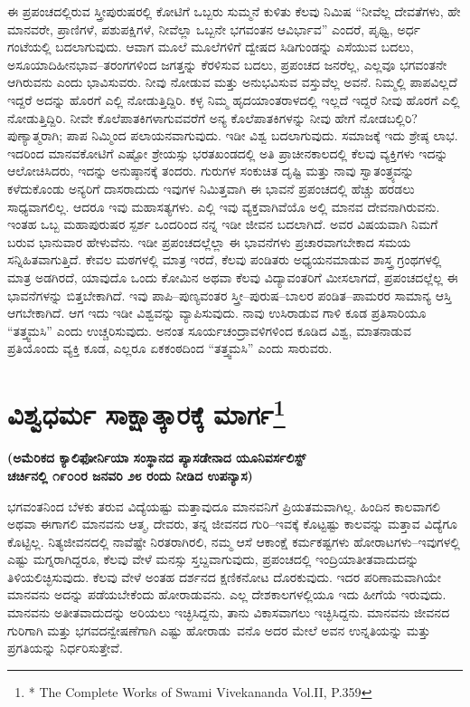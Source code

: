 ಈ ಪ್ರಪಂಚದಲ್ಲಿರುವ ಸ್ತ್ರೀಪುರುಷರಲ್ಲಿ ಕೋಟಿಗೆ ಒಬ್ಬರು ಸುಮ್ಮನೆ ಕುಳಿತು ಕೆಲವು ನಿಮಿಷ “ನೀವೆಲ್ಲ ದೇವತೆಗಳು, ಹೇ ಮಾನವರೇ, ಪ್ರಾಣಿಗಳೆ, ಪಶುಪಕ್ಷಿಗಳೆ, ನೀವೆಲ್ಲಾ ಒಬ್ಬನೇ ಭಗವಂತನ ಆವಿರ್ಭಾವ” ಎಂದರೆ, ಪೃಥ್ವಿ, ಅರ್ಧ ಗಂಟೆಯಲ್ಲಿ ಬದಲಾಗುವುದು. ಆವಾಗ ಮೂಲೆ ಮೂಲೆಗಳಿಗೆ ದ್ವೇಷದ ಸಿಡಿಗುಂಡನ್ನು ಎಸೆಯುವ ಬದಲು, ಅಸೂಯಾದಿಹೀನಭಾವ–ತರಂಗಗಳಿಂದ ಜಗತ್ತನ್ನು ಕೆರಳಿಸುವ ಬದಲು, ಪ್ರಪಂಚದ ಜನರೆಲ್ಲ, ಎಲ್ಲವೂ ಭಗವಂತನೇ ಆಗಿರುವನು ಎಂದು ಭಾವಿಸುವರು. ನೀವು ನೋಡುವ ಮತ್ತು ಅನುಭವಿಸುವ ವಸ್ತುವೆಲ್ಲ ಅವನೆ. ನಿಮ್ಮಲ್ಲಿ ಪಾಪವಿಲ್ಲದೆ ಇದ್ದರೆ ಅದನ್ನು ಹೊರಗೆ ಎಲ್ಲಿ ನೋಡುತ್ತಿದ್ದಿರಿ. ಕಳ್ಳ ನಿಮ್ಮ ಹೃದಯಾಂತರಾಳದಲ್ಲಿ ಇಲ್ಲದೆ ಇದ್ದರೆ ನೀವು ಹೊರಗೆ ಎಲ್ಲಿ ನೋಡುತ್ತಿದ್ದಿರಿ. ನೀವೇ ಕೊಲೆಪಾತಕಿಗಳಾಗುವವರೆಗೆ ಅನ್ಯ ಕೊಲೆಪಾತಕಿಗಳನ್ನು ನೀವು ಹೇಗೆ ನೋಡಬಲ್ಲಿರಿ? ಪುಣ್ಯಾತ್ಮರಾಗಿ; ಪಾಪ ನಿಮ್ಮಿಂದ ಪಲಾಯನವಾಗುವುದು. ಇಡೀ ವಿಶ್ವ ಬದಲಾಗುವುದು. ಸಮಾಜಕ್ಕೆ ಇದು ಶ್ರೇಷ್ಠ ಲಾಭ. ಇದರಿಂದ ಮಾನವಕೋಟಿಗೆ ಎಷ್ಟೋ ಶ್ರೇಯಸ್ಸು ಭರತಖಂಡದಲ್ಲಿ ಅತಿ ಪ್ರಾಚೀನಕಾಲದಲ್ಲಿ ಕೆಲವು ವ್ಯಕ್ತಿಗಳು ಇದನ್ನು ಆಲೋಚಿಸಿದರು, ಇದನ್ನು ಅನುಷ್ಠಾನಕ್ಕೆ ತಂದರು. ಗುರುಗಳ ಸಂಕುಚಿತ ದೃಷ್ಟಿ ಮತ್ತು ನಾವು ಸ್ವಾತಂತ್ರ್ಯವನ್ನು ಕಳೆದುಕೊಂಡು ಅನ್ಯರಿಗೆ ದಾಸರಾದುದು ಇವುಗಳ ನಿಮಿತ್ತವಾಗಿ ಈ ಭಾವನೆ ಪ್ರಪಂಚದಲ್ಲಿ ಹೆಚ್ಚು ಹರಡಲು ಸಾಧ್ಯವಾಗಲಿಲ್ಲ. ಆದರೂ ಇವು ಮಹಾಸತ್ಯಗಳು. ಎಲ್ಲಿ ಇವು ವ್ಯಕ್ತವಾಗಿವೆಯೊ ಅಲ್ಲಿ ಮಾನವ ದೇವನಾಗಿರುವನು. ಇಂತಹ ಒಬ್ಬ ಮಹಾಪುರುಷರ ಸ್ಪರ್ಶ ಒಂದರಿಂದ ನನ್ನ ಇಡೀ ಜೀವನ ಬದಲಾಗಿದೆ. ಅವರ ವಿಷಯವಾಗಿ ನಿಮಗೆ ಬರುವ ಭಾನುವಾರ ಹೇಳುವೆನು. ಇಡೀ ಪ್ರಪಂಚದಲ್ಲೆಲ್ಲಾ ಈ ಭಾವನೆಗಳು ಪ್ರಚಾರವಾಗಬೇಕಾದ ಸಮಯ ಸನ್ನಿಹಿತವಾಗುತ್ತಿದೆ. ಕೇವಲ ಮಠಗಳಲ್ಲಿ ಮಾತ್ರ ಇರದೆ, ಕೆಲವು ಪಂಡಿತರು ಅಧ್ಯಯನಮಾಡುವ ಶಾಸ್ತ್ರ ಗ್ರಂಥಗಳಲ್ಲಿ ಮಾತ್ರ ಅಡಗಿರದೆ, ಯಾವುದೊ ಒಂದು ಕೋಮಿನ ಅಥವಾ ಕೆಲವು ವಿದ್ಯಾವಂತರಿಗೆ ಮೀಸಲಾಗದೆ, ಪ್ರಪಂಚದಲ್ಲೆಲ್ಲ ಈ ಭಾವನೆಗಳನ್ನು ಬಿತ್ತಬೇಕಾಗಿದೆ. ಇವು ಪಾಪಿ–ಪುಣ್ಯವಂತರ ಸ್ತ್ರೀ–ಪುರುಷ–ಬಾಲರ ಪಂಡಿತ–ಪಾಮರರ ಸಾಮಾನ್ಯ ಆಸ್ತಿ ಆಗಬೇಕಾಗಿದೆ. ಆಗ ಇದು ಇಡೀ ವಿಶ್ವವನ್ನು ವ್ಯಾಪಿಸುವುದು. ನಾವು ಉಸಿರಾಡುವ ಗಾಳಿ ಕೂಡ ಪ್ರತಿಸಾರಿಯೂ “ತತ್ತ್ವಮಸಿ” ಎಂದು ಉಚ್ಚರಿಸುವುದು. ಅನಂತ ಸೂರ್ಯಚಂದ್ರಾವಳಿಗಳಿಂದ ಕೂಡಿದ ವಿಶ್ವ, ಮಾತನಾಡುವ ಪ್ರತಿಯೊಂದು ವ್ಯಕ್ತಿ ಕೂಡ, ಎಲ್ಲರೂ ಏಕಕಂಠದಿಂದ “ತತ್ತ್ವಮಸಿ” ಎಂದು ಸಾರುವರು.

\chapter{ವಿಶ್ವಧರ್ಮ ಸಾಕ್ಷಾತ್ಕಾರಕ್ಕೆ ಮಾರ್ಗ\protect\footnote{* The Complete Works of Swami Vivekananda Vol.II, P.359}}%

\begin{center}
\textbf{(ಅಮೆರಿಕದ ಕ್ಯಾಲಿಫೋರ್ನಿಯಾ ಸಂಸ್ಥಾನದ ಪ್ಯಾಸಡೇನಾದ ಯೂನಿವರ್ಸಲಿಸ್ಟ್​ \\ ಚರ್ಚಿನಲ್ಲಿ ೧೯೦೦ರ ಜನವರಿ ೨೮ ರಂದು ನೀಡಿದ ಉಪನ್ಯಾಸ)}
\end{center}

ಭಗವಂತನಿಂದ ಬೆಳಕು ತರುವ ವಿದ್ಯೆಯಷ್ಟು ಮತ್ತಾವುದೂ ಮಾನವನಿಗೆ ಪ್ರಿಯತಮವಾಗಿಲ್ಲ. ಹಿಂದಿನ ಕಾಲವಾಗಲಿ ಅಥವಾ ಈಗಾಗಲಿ ಮಾನವನು ಆತ್ಮ, ದೇವರು, ತನ್ನ ಜೀವನದ ಗುರಿ–ಇವಕ್ಕೆ ಕೊಟ್ಟಷ್ಟು ಕಾಲವನ್ನು ಮತ್ತಾವ ವಿದ್ಯೆಗೂ ಕೊಟ್ಟಿಲ್ಲ. ನಿತ್ಯಜೀವನದಲ್ಲಿ ನಾವೆಷ್ಟೇ ನಿರತರಾಗಿರಲಿ, ನಮ್ಮ ಆಸೆ ಆಕಾಂಕ್ಷೆ ಕರ್ಮಕಷ್ಟಗಳು ಹೋರಾಟಗಳು–ಇವುಗಳಲ್ಲಿ ಎಷ್ಟು ಮಗ್ನರಾಗಿದ್ದರೂ, ಕೆಲವು ವೇಳೆ ಮನಸ್ಸು ಸ್ತಬ್ದವಾಗುವುದು, ಪ್ರಪಂಚದಲ್ಲಿ ಇಂದ್ರಿಯಾತೀತವಾದುದನ್ನು ತಿಳಿಯಲಿಚ್ಛಿಸುವುದು. ಕೆಲವು ವೇಳೆ ಅಂತಹ ದರ್ಶನದ ಕ್ಷಣಿಕನೋಟ ದೊರಕುವುದು. ಇದರ ಪರಿಣಾಮವಾಗಿಯೇ ಮಾನವನು ಅದನ್ನು ಪಡೆಯಬೇಕೆಂದು ಹೋರಾಡುವನು. ಎಲ್ಲ ದೇಶಕಾಲಗಳಲ್ಲಿಯೂ ಇದು ಹೀಗೆಯೆ ಇರುವುದು. ಮಾನವನು ಅತೀತವಾದುದನ್ನು ಅರಿಯಲು ಇಚ್ಛಿಸಿದ್ದನು, ತಾನು ವಿಕಾಸವಾಗಲು ಇಚ್ಛಿಸಿದ್ದನು. ಮಾನವನು ಜೀವನದ ಗುರಿಗಾಗಿ ಮತ್ತು ಭಗವದನ್ವೇಷಣೆಗಾಗಿ ಎಷ್ಟು ಹೋರಾಡು\break\ ವನೊ ಅದರ ಮೇಲೆ ಅವನ ಉನ್ನತಿಯನ್ನು ಮತ್ತು ಪ್ರಗತಿಯನ್ನು ನಿರ್ಧರಿಸುತ್ತೇವೆ.

